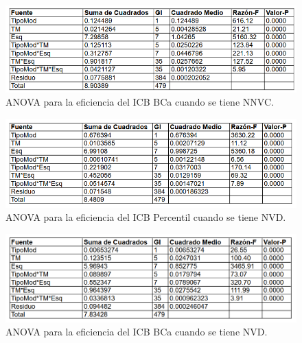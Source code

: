 \begin{figure}[ht] 
	\centering 
	\includegraphics[width=0.95\linewidth]{img/ANOVA_Efic_ICB_BCa_NNVC.png} 
	\caption{ANOVA para la eficiencia del ICB BCa cuando se tiene NNVC.} 
	\label{fig:ANOVA_Efic_ICB_BCa_NNVC}
\end{figure}
\FloatBarrier







\begin{figure}[ht] 
	\centering 
	\includegraphics[width=0.95\linewidth]{img/ANOVA_Efic_ICB_Perc_NVD.png} 
	\caption{ANOVA para la eficiencia del ICB Percentil cuando se tiene NVD.} 
	\label{fig:ANOVA_Efic_ICB_Perc_NVD}
\end{figure}
\FloatBarrier



\begin{figure}[ht] 
	\centering 
	\includegraphics[width=0.95\linewidth]{img/ANOVA_Efic_ICB_BCa_NVD.png} 
	\caption{ANOVA para la eficiencia del ICB BCa cuando se tiene NVD.} 
	\label{fig:ANOVA_Efic_ICB_BCa_NVD}
\end{figure}
\FloatBarrier






